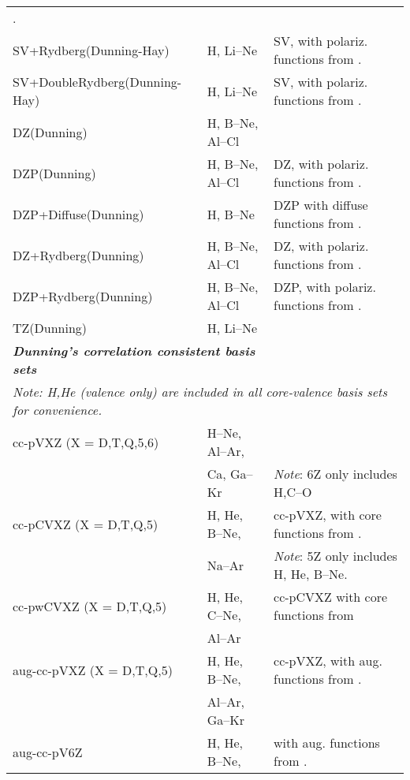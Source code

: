 \begin{longtable}{lll}
  \cite{thdpjhhfs1977,emhfsjcp83}.\\
SV+Rydberg(Dunning-Hay) & H, Li--Ne & SV, with polariz. functions from
  \cite{thdpjhhfs1977-2}.\\
\small{SV+DoubleRydberg(Dunning-Hay)} & H, Li--Ne & SV, with polariz. functions from
  \cite{thdpjhhfs1977-2}.\\
DZ(Dunning) & H, B--Ne, Al--Cl & \cite{thdjcp53,thdpjhhfs1977} \\
DZP(Dunning) & H, B--Ne, Al--Cl & DZ, with polariz. functions from 
  \cite{thdpjhhfs1977,emhfsjcp83}.\\
DZP+Diffuse(Dunning) & H, B--Ne & DZP with diffuse functions from
  \cite{thdpjhhfs1977,emhfsjcp83}.\\
DZ+Rydberg(Dunning) & H, B--Ne, Al--Cl & DZ, with polariz. functions from
  \cite{thdpjhhfs1977-2}.\\
DZP+Rydberg(Dunning) & H, B--Ne, Al--Cl & DZP, with polariz. functions from 
  \cite{thdpjhhfs1977-2}.\\
TZ(Dunning) & H, Li--Ne & \cite{thdjcp55}\\
\hline
\multicolumn{2}{l}{\bf{\emph{Dunning's correlation consistent basis 
sets\index{basis set!correlation-consistent}\index{correlation-consistent basis set}}}} \\
\multicolumn{3}{l}{\emph{Note: H,He (valence only) are included in all core-valence basis sets 
  for convenience.}} \\
cc-pVXZ (X = D,T,Q,5,6) & H--Ne, Al--Ar, & \cite{thdjcp90,dewthdjcp100,dewthdjcp98,
  jkkapjpca106,akwdewkapthdjcp110} \\
  & Ca, Ga--Kr & \emph{Note}: 6Z only includes H,C--O\\
cc-pCVXZ (X = D,T,Q,5) & H, He, B--Ne, & cc-pVXZ, with core functions from
  \cite{thdjcp90,jkkapjpca106,dewthdjcp103}. \\
  & Na--Ar & \emph{Note}: 5Z only includes H, He, B--Ne. \\
cc-pwCVXZ (X = D,T,Q,5) & H, He, C--Ne,  & cc-pCVXZ with core functions from 
  \cite{thdjcp90,kapthdjcp117} \\
  & Al--Ar & \\
aug-cc-pVXZ (X = D,T,Q,5) & H, He, B--Ne, & cc-pVXZ, with aug. functions from 
  \cite{thdjcp90,rakthdrjhjcp96,dewthdjcp98,dewthdjcp100}.\\
  & Al--Ar, Ga--Kr & \\
aug-cc-pV6Z & H, He, B--Ne, & \cite{akwtvmthdjsm388,tmakwtdhmp96} with aug. functions from 
  \cite{akwtvmthdjsm388,tmakwtdhmp96,tmthdijqc76}.\\

\end{longtable}
